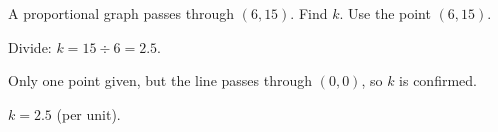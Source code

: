 \begin{stepExample}{A proportional graph passes through $(6, 15)$. Find $k$.}
     Use the point $(6, 15)$.

     Divide: $k = 15 \div 6 = 2.5$.

     Only one point given, but the line passes through $(0, 0)$, so $k$ is confirmed.

     $k = 2.5$ (per unit).
\end{stepExample}


\newpage

